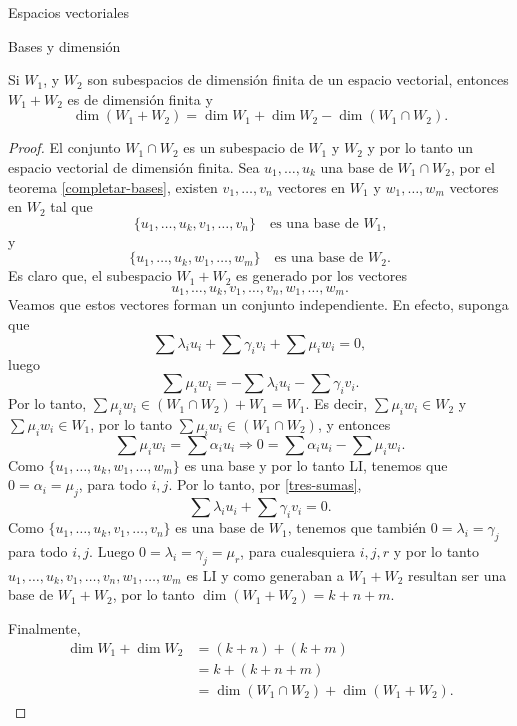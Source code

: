\begin{chapter}{Espacios vectoriales}
\begin{section}{Bases y dimensi\'on}
    \begin{teorema}
        Si $W_1$, y $W_2$ son subespacios de dimensión finita de un espacio vectorial, entonces $W_1+ W_2$ es de dimensión finita y 
        $$ \dim (W_1 + W_2) = \dim W_1 + \dim W_2 - \dim (W_1 \cap W_2).$$
    \end{teorema}
    \begin{proof}
         El  conjunto $W_1 \cap W_2$  es un subespacio de $W_1$ y $W_2$ y por lo tanto un espacio vectorial de dimensión finita. Sea  $u_1,\ldots,u_k$ una base de $W_1 \cap W_2$, por el teorema \ref{completar-bases},  existen $v_1,\ldots,v_n$ vectores en $W_1$ y $w_1,\ldots,w_m$ vectores en $W_2$  tal que
         $$
         \{u_1,\ldots,u_k,v_1,\ldots,v_n\}\quad  \text{es una base de $W_1$,}
         $$
          y
          $$
         \{u_1,\ldots,u_k,w_1,\ldots,w_m\}\quad \text{es una base de $W_2$.}
         $$
        Es claro que, el subespacio $W_1+ W_2$ es generado por los vectores 
        $$
        u_1,\ldots,u_k,v_1,\ldots,v_n,w_1,\ldots,w_m.
        $$
        Veamos que estos  vectores forman un conjunto independiente. En efecto, suponga que
        \begin{equation}\label{tres-sumas}
            \sum \lambda_i u_i + \sum \gamma_i v_i + \sum \mu_i w_i =0,
        \end{equation}
        luego
        $$
        \sum \mu_i w_i = - \sum \lambda_i u_i - \sum \gamma_i v_i.
        $$
        Por  lo tanto, $\sum \mu_i w_i \in (W_1 \cap W_2) + W_1 = W_1$. Es  decir,  $\sum \mu_i w_i \in W_2$ y $\sum \mu_i w_i \in W_1$, por lo tanto $\sum \mu_i w_i \in (W_1 \cap W_2)$, y entonces
        $$
        \sum \mu_i w_i  = \sum \alpha_i u_i \Rightarrow 0 = \sum \alpha_i u_i - \sum \mu_i w_i .
        $$
        Como $\{u_1,\ldots,u_k,w_1,\ldots,w_m\}$ es una base y por lo tanto LI, tenemos que $0=\alpha_i=\mu_j$, para todo $i,j$. Por lo tanto, por \eqref{tres-sumas}, 
        \begin{equation}\label{dos-sumas}
        \sum \lambda_i u_i + \sum \gamma_i v_i  =0.
        \end{equation}
        Como $ \{u_1,\ldots,u_k,v_1,\ldots,v_n\}$  es una base de $W_1$,  tenemos que también $0=\lambda_i = \gamma_j$ para todo $i,j$. Luego  $0=\lambda_i = \gamma_j = \mu_r$, para cualesquiera $i,j,r$ y por lo tanto $u_1,\ldots,u_k,v_1,\ldots,v_n,w_1,\ldots,w_m$ es LI y  como  generaban a  $W_1+W_2$ resultan ser una base de $W_1+W_2$, por lo tanto $\dim (W_1+W_2) = k+n+m$.
        
        Finalmente,
        \begin{align*}
            \dim W_1 + \dim W_2&= (k+n)+(k+m) \\&	=k+(k+n+m)\\ &=  \dim (W_1 \cap W_2) + \dim (W_1 + W_2) .
        \end{align*}
    \end{proof}



\end{section}
\end{chapter}
